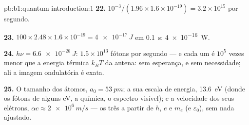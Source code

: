 \begin{solution}{pb:b1:quantum-introduction:1}
\textbf{22.} $10^{-3}/(1.96 \times 1.6 \times 10^{-19}) = 3.2 \times 10^{15}$ por segundo.

\textbf{23.} $100 \times 2.48 \times 1.6 \times 10^{-19} = \qty{4e-17}{J}$ em \qty{0.1}{s}:
\qty{4e-16}{W}.

\textbf{24.} $h\nu = \qty{6.6e-26}{J}$: $1.5 \times 10^{13}$ fótons por segundo ---
e cada um é $10^5$ vezes menor que a energia térmica $k_BT$ da
antena: sem esperança, e sem necessidade; ali a imagem ondulatória é exata.

\textbf{25.} O tamanho dos átomos, $a_0 = \qty{53}{pm}$; a sua escala de energia,
\qty{13.6}{eV} (donde os fótons de alguns eV, a química, o espectro visível); e
a velocidade dos seus elétrons, $\alpha c \approx \qty{2e6}{m/s}$ --- os três
a partir de $h$, $e$ e $m_e$ (e $\varepsilon_0$), sem nada ajustado.
\end{solution}
